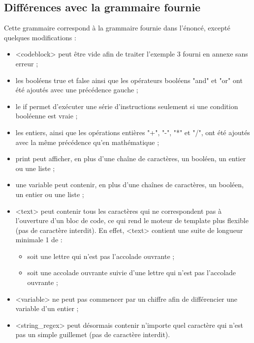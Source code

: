 \documentclass[10pt,a4paper]{article}
\begin{document}
	\subsection{Différences avec la grammaire fournie}
	Cette grammaire correspond à la grammaire fournie dans l'énoncé, excepté quelques modifications :
	\begin{itemize}
		\item <codeblock> peut être vide afin de traiter l'exemple 3 fourni en annexe sans erreur ;
		
		\item les booléens true et false ainsi que les opérateurs booléens "and" et "or" ont été ajoutés avec une précédence gauche ;
		
		\item le if permet d'exécuter une série d'instructions seulement si une condition booléenne est vraie ;
		
		\item les entiers, ainsi que les opérations entières "+", "-", "*" et "/", ont été ajoutés avec la même précédence qu'en mathématique ;
		
		\item print peut afficher, en plus d'une chaîne de caractères, un booléen, un entier ou une liste ;
		
		\item une variable peut contenir, en plus d'une chaînes de caractères, un booléen, un entier ou une liste ;
		
		\item <text> peut contenir tous les caractères qui ne correspondent pas à l'ouverture d'un bloc de code, ce qui rend le moteur de template plus flexible (pas de caractère interdit).
		En effet, <text> contient une suite de longueur minimale 1 de :
		\begin{itemize}
			\item soit une lettre qui n'est pas l'accolade ouvrante ;
			\item soit une accolade ouvrante suivie d'une lettre qui n'est pas l'accolade ouvrante ;
		\end{itemize}
		
		\item <variable> ne peut pas commencer par un chiffre afin de différencier une variable d'un entier ;
		
		\item <string\_regex> peut désormais contenir n'importe quel caractère qui n'est pas un simple guillemet (pas de caractère interdit).
	\end{itemize}
	
\end{document}
